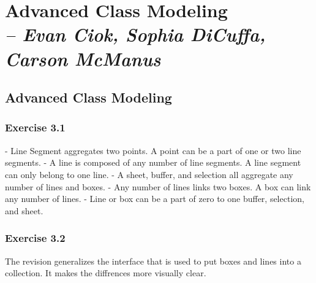 \chapter{Advanced Class Modeling \\
  \small{\textit{-- Evan Ciok, Sophia DiCuffa, Carson McManus}}
  \label{Chapter::LabTwo}}

\section{Advanced Class Modeling \label{Section::LabTwo}}

\subsection{Exercise 3.1}

- Line Segment aggregates two points. A point can be a part of one or two line segments.
- A line is composed of any number of line segments. A line segment can only belong to one line.
- A sheet, buffer, and selection all aggregate any number of lines and boxes. 
- Any number of lines links two boxes. A box can link any number of lines.
- Line or box can be a part of zero to one buffer, selection, and sheet.

\subsection{Exercise 3.2}

The revision generalizes the interface that is used to put boxes and lines into a collection. It makes 
the diffrences more visually clear.
